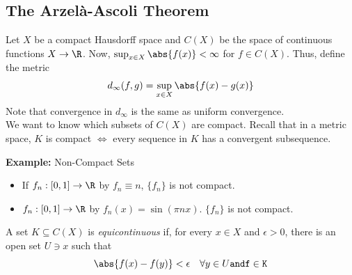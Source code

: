 \subsection*{The Arzel\`a-Ascoli Theorem}
\sectionspace

Let $X$ be a compact Hausdorff space and $C(X)$ be the space of continuous functions $X \to \R$. Now, $\sup_{x \in X} \abs{f(x)} < \infty$ for $f \in C(X)$. Thus, define the metric
\[ d_{\infty}(f, g) = \sup_{x \in X} \abs{f(x) - g(x)} \]
Note that convergence in $d_{\infty}$ is the same as uniform convergence.\\

We want to know which subsets of $C(X)$ are compact. Recall that in a metric space, $K$ is compact $\iff$ every sequence in $K$ has a convergent subsequence.

\begin{example}{\textbf{Example:} Non-Compact Sets}
    \begin{itemize}
        \item If $f_n : [0, 1] \to \R$ by $f_n \equiv n$, $\{f_n\}$ is not compact.
        \item $f_n : [0, 1] \to \R$ by $f_n(x) = \sin(\pi nx)$. $\{f_n\}$ is not compact.
    \end{itemize}
\end{example}

\begin{definition}
    A set $K \subseteq C(X)$ is \emph{equicontinuous} if, for every $x \in X$ and $\epsilon > 0$, there is an open set $U \ni x$ such that
    \[ \abs{f(x) - f(y)} < \epsilon \quad \forall y \in U \tt{ and } f \in K \]
\end{definition}

